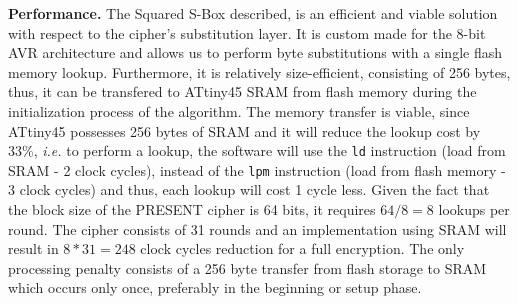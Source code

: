 \documentclass[11pt]{article}
\begin{document}
\textbf{Performance.} The Squared S-Box described, is an efficient and viable solution with respect to the cipher's substitution layer. It is custom made for the 8-bit AVR architecture and allows us to perform byte substitutions with a single flash memory lookup. Furthermore, it is relatively size-efficient, consisting of 256 bytes, thus, it can be transfered to ATtiny45 SRAM from flash memory during the initialization process of the algorithm. The memory transfer is viable, since ATtiny45 possesses 256 bytes of SRAM and it will reduce the lookup cost by 33\%, \emph{i.e.} to perform a lookup, the software will use the \texttt{ld} instruction (load from SRAM - 2 clock cycles), instead of  the \texttt{lpm} instruction (load from flash memory - 3 clock cycles) and thus, each lookup will cost 1 cycle less. Given the fact that the block size of the PRESENT cipher is 64 bits, it requires $64/8=8$ lookups per round. The cipher consists of 31 rounds and an implementation using SRAM will result in $8*31=248$ clock cycles reduction for a full encryption. The only processing penalty consists of a 256 byte transfer from flash storage to SRAM which occurs only once, preferably in the beginning or setup phase.
\end{document}
